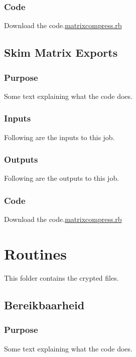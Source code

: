 \documentclass[
  letterpaper,
  DIV=11,
  numbers=noendperiod]{scrreprt}
\begin{document}
\section{Code}

Download the code.\href{../first.rb}{matrixcompress.rb}

\chapter{Skim Matrix Exports}\label{skim-matrix-exports}

\section{Purpose}

Some text explaining what the code does.

\section{Inputs}

Following are the inputs to this job.

\section{Outputs}

Following are the outputs to this job.

\section{Code}

Download the code.\href{../first.rb}{matrixcompress.rb}

\part{Routines}

This folder contains the crypted files.

\chapter{Bereikbaarheid}\label{bereikbaarheid}

\section{Purpose}

Some text explaining what the code does.
\end{document}
